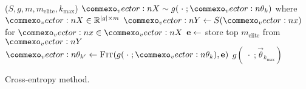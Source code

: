\begin{algorithm}[ht]
  \begin{algorithmic}
  ($S, g, m, m_\text{elite}, k_\text{max}$)
        \State $\mat{X} \sim g(\;\cdot\;; \vec{\theta}_k)$ where $\mat{X} \in \R^{|g|\times m}$
        \State $\mat{Y} \leftarrow S(\vec{x})$ for $\vec{x} \in \mat{X}$ 
        \State $\mathbf{e} \leftarrow$ store top $m_\text{elite}$ from $\mat{Y}$ 
        \State $\vec{\theta}_{k^\prime} \leftarrow \textproc{Fit}(g(\;\cdot\;; \vec{\theta}_k), \e)$ 
    \EndFor
    \State \Return $g(\;\cdot\;; \vec{\theta}_{k_\text{max}})$
  \EndFunction
  \end{algorithmic}
  \caption{\label{alg:cem} Cross-entropy method.}
\end{algorithm}
